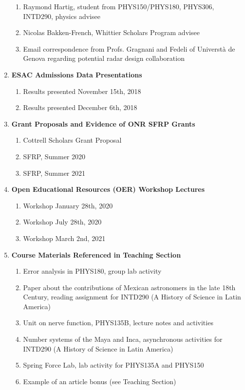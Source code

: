 \documentclass[../../main.tex]{subfiles}
\begin{document}
\begin{enumerate}
\begin{enumerate}
\item Raymond Hartig, student from PHYS150/PHYS180, PHYS306, INTD290, physics advisee
\item Nicolas Bakken-French, Whittier Scholars Program advisee
\item Email correspondence from Profs. Gragnani and Fedeli of Universt\`{a} de Genova regarding potential radar design collaboration
\end{enumerate}
\item \textbf{ESAC Admissions Data Presentations}
\begin{enumerate}
\item Results presented November 15th, 2018
\item Results presented December 6th, 2018
\end{enumerate}
\item \textbf{Grant Proposals and Evidence of ONR SFRP Grants}
\begin{enumerate}
\item Cottrell Scholars Grant Proposal
\item SFRP, Summer 2020
\item SFRP, Summer 2021
\end{enumerate}
\item \textbf{Open Educational Resources (OER) Workshop Lectures}
\begin{enumerate}
\item Workshop January 28th, 2020
\item Workshop July 28th, 2020
\item Workshop March 2nd, 2021
\end{enumerate}
\item \textbf{Course Materials Referenced in Teaching Section}
\begin{enumerate}
\item Error analysis in PHYS180, group lab activity
\item Paper about the contributions of Mexican astronomers in the late 18th Century, reading assignment for INTD290 (A History of Science in Latin America)
\item Unit on nerve function, PHYS135B, lecture notes and activities
\item Number systems of the Maya and Inca, asynchronous activities for INTD290 (A History of Science in Latin America)
\item Spring Force Lab, lab activity for PHYS135A and PHYS150
\item Example of an article bonus (see Teaching Section)

\end{enumerate}
\end{enumerate}
\end{document}
